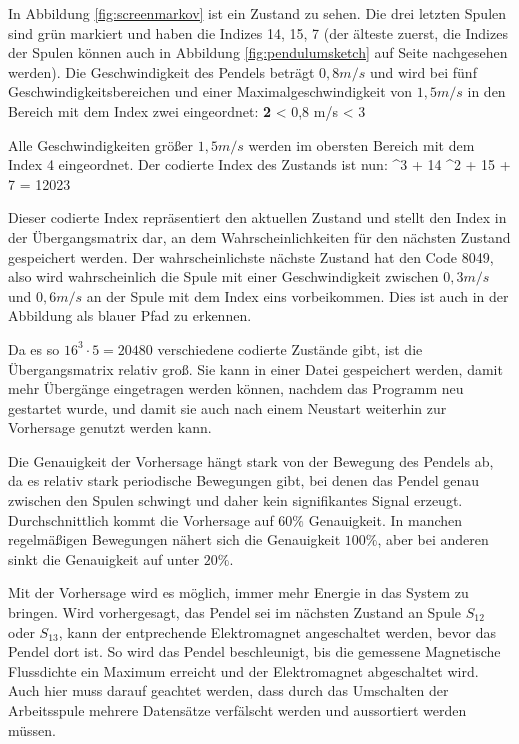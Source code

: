 In Abbildung \ref{fig:screenmarkov} ist ein Zustand zu sehen.
Die drei letzten Spulen sind grün markiert und haben die Indizes 14, 15, 7 (der älteste zuerst, die Indizes der Spulen können auch in Abbildung \ref{fig:pendulumsketch} auf Seite \pageref{fig:pendulumsketch} nachgesehen werden).
Die Geschwindigkeit des Pendels beträgt $0,8 m/s$ und wird bei fünf Geschwindigkeitsbereichen und einer Maximalgeschwindigkeit von $1,5 m/s$ in den Bereich mit dem Index zwei eingeordnet:
\mathematik
\textbf{2}\cdot{} < 0,8 m/s < 3\cdot{}
\mathematikstop

Alle Geschwindigkeiten größer $1,5 m/s$ werden im obersten Bereich mit dem Index 4 eingeordnet.
Der codierte Index des Zustands ist nun:
 ^3 + 14 ^2 + 15  + 7 = 12023
\mathematikstop

Dieser codierte Index repräsentiert den aktuellen Zustand und stellt den Index in der Übergangsmatrix dar, an dem Wahrscheinlichkeiten für den nächsten Zustand gespeichert werden.
Der wahrscheinlichste nächste Zustand hat den Code 8049, also wird wahrscheinlich die Spule mit einer Geschwindigkeit zwischen $0,3 m/s$ und $0,6 m/s$ an der Spule mit dem Index eins vorbeikommen.
Dies ist auch in der Abbildung als blauer Pfad zu erkennen.

Da es so $16^3 \cdot 5 = 20480$ verschiedene codierte Zustände gibt, ist die Übergangsmatrix relativ groß.
Sie kann in einer Datei gespeichert werden, damit mehr Übergänge eingetragen werden können, nachdem das Programm neu gestartet wurde, und damit sie auch nach einem Neustart weiterhin zur Vorhersage
genutzt werden kann.

Die Genauigkeit der Vorhersage hängt stark von der Bewegung des Pendels ab, da es relativ stark periodische Bewegungen gibt, bei denen das Pendel genau zwischen den Spulen schwingt und daher kein signifikantes Signal erzeugt.
Durchschnittlich kommt die Vorhersage auf $60\%$ Genauigkeit.
In manchen regelmäßigen Bewegungen nähert sich die Genauigkeit $100\%$, aber bei anderen sinkt die Genauigkeit auf unter $20\%$.

Mit der Vorhersage wird es möglich, immer mehr Energie in das System zu bringen.
Wird vorhergesagt, das Pendel sei im nächsten Zustand an Spule $S_{12}$ oder $S_{13}$, kann der entprechende Elektromagnet angeschaltet werden, bevor das Pendel dort ist.
So wird das Pendel beschleunigt, bis die gemessene Magnetische Flussdichte ein Maximum erreicht und der Elektromagnet abgeschaltet wird.
Auch hier muss darauf geachtet werden, dass durch das Umschalten der Arbeitsspule mehrere Datensätze verfälscht werden und aussortiert werden müssen.

